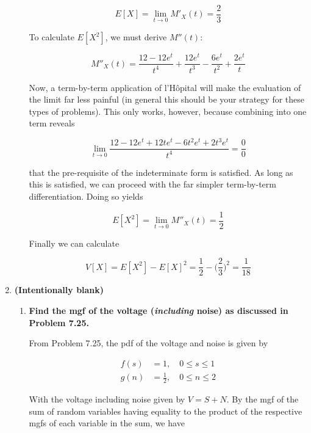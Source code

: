 \documentclass[10pt, oneside]{article}   	%
\theoremstyle{definition}
\begin{document}
\begin{enumerate}[label=10.\arabic*]
\begin{enumerate}
	\[ E[X] = \lim_{t \rightarrow 0} M'_X(t) = \boxed{ \frac{2}{3} }\]
	
	To calculate $E[X^2]$, we must derive $M''(t)$:
	
	\[ M''_X(t) = \frac{12-12e^t}{t^4} + \frac{12e^t}{t^3} - \frac{6e^t}{t^2} + \frac{2e^t}{t} \]
	
	Now, a term-by-term application of l'H\^{o}pital will make the evaluation of the limit far less painful (in general this should be your strategy for these types of problems). This only works, however, because combining into one term reveals
	
	\[ \lim_{t \rightarrow 0} \frac{12 - 12e^t + 12te^t - 6t^2 e^t + 2t^3 e^t}{t^4} = \frac{0}{0} \]
	
	that the pre-requisite of the indeterminate form is satisfied. As long as this is satisfied, we can proceed with the far simpler term-by-term differentiation. Doing so yields
	
	\[ E[X^2] = \lim_{t \rightarrow 0} M''_X(t) = \frac{1}{2} \]
	
	Finally we can calculate
	
	\[ V[X] = E[X^2] - E[X]^2 = \frac{1}{2} - \bigg( \frac{2}{3} \bigg)^2 = \boxed{\frac{1}{18}} \]
	
	\end{enumerate}

\item  \begin{tcolorbox}[
  colback=Cerulean!5!white,
  colframe=Cerulean!75!black]
\textbf{(Intentionally blank)}
\end{tcolorbox}

	\begin{enumerate}
	\item  \begin{tcolorbox}[
	  colback=Cerulean!5!white,
	  colframe=Cerulean!75!black]
	\textbf{Find the mgf of the voltage (\textit{including} noise) as discussed in Problem 7.25.}
	\end{tcolorbox}
	
	From Problem 7.25, the pdf of the voltage and noise is given by
	
	\begin{align*}
	f(s) &= 1, \quad 0 \leq s \leq 1 \\
	g(n) &= \frac{1}{2}, \quad 0 \leq n \leq 2
	\end{align*}
	
	With the voltage including noise given by $V = S + N$. By the mgf of the sum of random variables having equality to the product of the respective mgfs of each variable in the sum, we have
	

\end{enumerate}
\end{enumerate}
\end{document}
